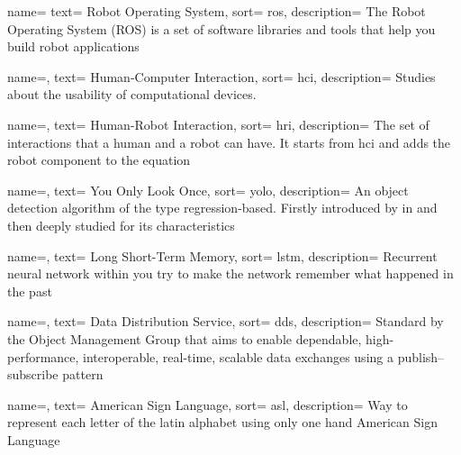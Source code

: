 {
  name=
  text= Robot Operating System,
  sort= ros,
  description= {The Robot Operating System (ROS) is a set of software libraries and tools that help you build robot applications~\cite{site:ros}}
}

{
  name=,
  text= Human-Computer Interaction,
  sort= hci,
  description= {Studies about the usability of computational devices.}
}

{
  name=,
  text= Human-Robot Interaction,
  sort= hri,
  description= {The set of interactions that a human and a robot can have. It starts from \gls{hci} and adds the robot component to the equation}
}

{
  name=,
  text= You Only Look Once,
  sort= yolo,
  description= {An object detection algorithm of the type regression-based. Firstly introduced by \citeauthor{paper:yolov1}\cite{paper:yolov1} in \citeyear{paper:yolov1} and then deeply studied for its characteristics}
}

{
  name=,
  text= Long Short-Term Memory,
  sort= lstm,
  description= {Recurrent neural network within you try to make the network remember what happened in the past}
}

{
  name=,
  text= Data Distribution Service,
  sort= dds,
  description= {Standard by the Object Management Group that aims to enable dependable, high-performance, interoperable, real-time, scalable data exchanges using a publish–subscribe pattern}
}

{
  name=,
  text= American Sign Language,
  sort= asl,
  description= {Way to represent each letter of the latin alphabet using only one hand}
}
 {American Sign Language}

